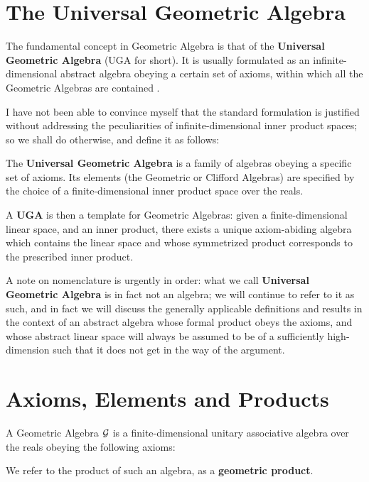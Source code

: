 \section{The Universal Geometric Algebra}

The fundamental concept in Geometric Algebra is that of the \textbf{Universal Geometric Algebra} (UGA for short). It is usually formulated as an infinite-dimensional abstract algebra obeying a certain set of axioms, within which all the Geometric Algebras are contained \cite{ga-origin}. 

I have not been able to convince myself that the standard formulation is justified without addressing the peculiarities of infinite-dimensional inner product spaces; so we shall do otherwise, and define it as follows:
\begin{definition}
	The \textbf{Universal Geometric Algebra} is a family of algebras obeying a specific set of axioms. Its elements (the Geometric or Clifford Algebras) are specified by the choice of a finite-dimensional inner product space over the reals.
\end{definition}

A \textbf{UGA} is then a template for Geometric Algebras: given a finite-dimensional linear space, and an inner product, there exists a unique axiom-abiding algebra which contains the linear space and whose symmetrized product corresponds to the prescribed inner product.

A note on nomenclature is urgently in order: what we call \textbf{Universal Geometric Algebra} is in fact not an algebra; we will continue to refer to it as such, and in fact we will discuss the generally applicable definitions and results in the context of an abstract algebra whose formal product obeys the axioms, and whose abstract linear space will always be assumed to be of a sufficiently high-dimension such that it does not get in the way of the argument.

\newpage

\section{Axioms, Elements and Products}

A Geometric Algebra $\mathcal{G}$  is a finite-dimensional unitary associative algebra over the reals obeying the following axioms:

We refer to the product of such an algebra, as a \textbf{geometric product}.

